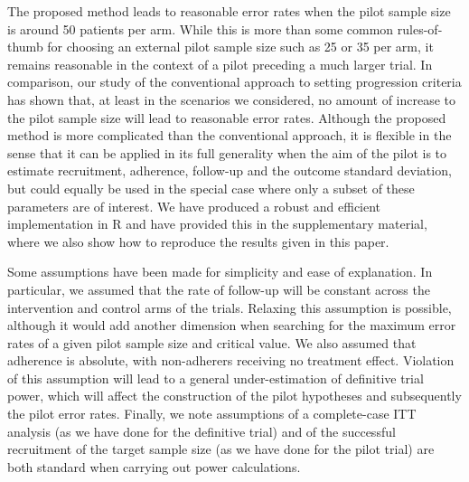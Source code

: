\documentclass{article}
\begin{document}
The proposed method leads to reasonable error rates when the pilot sample size is around 50 patients per arm. While this is more than some common rules-of-thumb for choosing an external pilot sample size such as 25 \cite{Whitehead2015} or 35 \cite{Teare2014} per arm, it remains reasonable in the context of a pilot preceding a much larger trial. In comparison, our study of the conventional approach to setting progression criteria has shown that, at least in the scenarios we considered, no amount of increase to the pilot sample size will lead to reasonable error rates. Although the proposed method is more complicated than the conventional approach, it is flexible in the sense that it can be applied in its full generality when the aim of the pilot is to estimate recruitment, adherence, follow-up and the outcome standard deviation, but could equally be used in the special case where only a subset of these parameters are of interest. We have produced a robust and efficient implementation in R and have provided this in the supplementary material, where we also show how to reproduce the results given in this paper.

Some assumptions have been made for simplicity and ease of explanation. In particular, we assumed that the rate of follow-up will be constant across the intervention and control arms of the trials. Relaxing this assumption is possible, although it would add another dimension when searching for the maximum error rates of a given pilot sample size and critical value. We also assumed that adherence is absolute, with non-adherers receiving no treatment effect. Violation of this assumption will lead to a general under-estimation of definitive trial power, which will affect the construction of the pilot hypotheses and subsequently the pilot error rates. Finally, we note assumptions of a complete-case ITT analysis (as we have done for the definitive trial) and of the successful recruitment of the target sample size (as we have done for the pilot trial) are both standard when carrying out power calculations.
\end{document}
